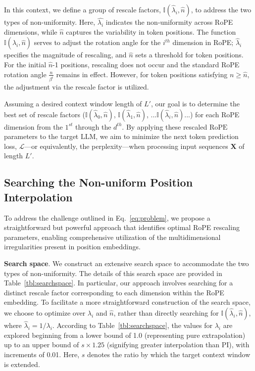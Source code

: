 In this context, we define a group of rescale factors, $\mathbb{I}(\hat{\lambda}_{i},\hat{n})$, to address the two types of non-uniformity. Here, $\hat{\lambda_i}$ indicates the non-uniformity across RoPE dimensions, while $\hat{n}$ captures the variability in token positions. The function $\mathbb{I}(\hat{\lambda}_{i},\hat{n})$ serves to adjust the rotation angle for the $i^{th}$ dimension in RoPE; $\hat\lambda_{i}$ specifies the magnitude of rescaling, and $\hat{n}$ sets a threshold for token positions. For the initial $\hat{n}$-1 positions, rescaling does not occur and the standard RoPE rotation angle $\frac{n}{\beta^i}$ remains in effect. However, for token positions satisfying $n\ge\hat{n}$, the adjustment via the rescale factor is utilized.

Assuming a desired context window length of $L'$, our goal is to determine the best set of rescale factors ($\mathbb{I}(\hat{\lambda}_{0},\hat{n})$, $\mathbb{I}(\hat{\lambda}_{1},\hat{n})$, ...$\mathbb{I}(\hat{\lambda}_{i},\hat{n})$...) for each RoPE dimension from the $1^{st}$ through the $d^{th}$. By applying these rescaled $\text{RoPE}$ parameters to the target $\text{LLM}$, we aim to minimize the next token prediction loss, $\mathcal{L}$—or equivalently, the perplexity—when processing input sequences $\mathbf{X}$ of length $L'$.

\subsection{Searching the Non-uniform Position Interpolation}

To address the challenge outlined in Eq.~\ref{eq:problem}, we propose a straightforward but powerful approach that identifies optimal RoPE rescaling parameters, enabling comprehensive utilization of the multidimensional irregularities present in position embeddings.

\textbf{Search space}. We construct an extensive search space to accommodate the two types of non-uniformity. The details of this search space are provided in Table~\ref{tbl:searchspace}. In particular, our approach involves searching for a distinct rescale factor corresponding to each dimension within the RoPE embedding. To facilitate a more straightforward construction of the search space, we choose to optimize over $\lambda_i$ and $\hat{n}$, rather than directly searching for $\mathbb{I}(\hat{\lambda}_{i},\hat{n})$, where  $\hat{\lambda}_{i}=1/\lambda_i$. According to Table~\ref{tbl:searchspace}, the values for $\lambda_i$ are explored beginning from a lower bound of 1.0 (representing pure extrapolation) up to an upper bound of $s\times1.25$ (signifying greater interpolation than PI), with increments of 0.01. Here, $s$ denotes the ratio by which the target context window is extended.

